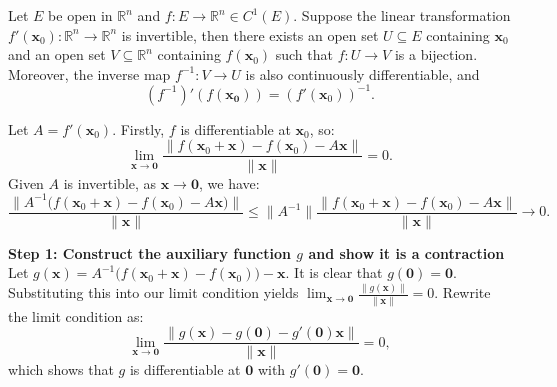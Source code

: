 \begin{theorem}
Let $E$ be open in $\mathbb{R}^n$ and $f:E\to\mathbb{R}^n\in C^1(E).$ Suppose the linear transformation $f'(\mathbf{x}_0):\mathbb{R}^n\to\mathbb{R}^n$ is invertible, then there exists an open set $U\subseteq E$ containing $\mathbf{x}_0$ and an open set $V\subseteq\mathbb{R}^n$ containing $f(\mathbf{x}_0)$ such that $f:U\to V$ is a bijection.
Moreover, the inverse map $f^{-1}:V\to U$ is also continuously differentiable, and 
$$(f^{-1})'(f(\mathbf{x_0}))=(f'(\mathbf{x}_0))^{-1}.$$
\end{theorem}


\begin{pfbox}

Let $A=f'(\mathbf{x}_0)$. Firstly, $f$ is differentiable at $\mathbf{x}_0$, so:
$$ \lim_{\mathbf{x}\to \mathbf{0}}\frac{\|f(\mathbf{x}_0+\mathbf{x})-f(\mathbf{x}_0)-A\mathbf{x}\|}{\|\mathbf{x}\|} = 0. $$
Given $A$ is invertible, as $\mathbf{x}\to\mathbf{0}$, we have:
$$ \frac{\|A^{-1}\big(f(\mathbf{x}_0+\mathbf{x})-f(\mathbf{x}_0)-A\mathbf{x}\big)\|}{\|\mathbf{x}\|} \le \|A^{-1}\|\frac{\|f(\mathbf{x}_0+\mathbf{x})-f(\mathbf{x}_0)-A\mathbf{x}\|}{\|\mathbf{x}\|} \to 0. $$

\vspace{0.8em}
\noindent \textbf{Step 1: Construct the auxiliary function $g$ and show it is a contraction}\\
Let $g(\mathbf{x})=A^{-1}\big(f(\mathbf{x}_0+\mathbf{x})-f(\mathbf{x}_0)\big)-\mathbf{x}$. It is clear that $g(\mathbf{0})=\mathbf{0}$.
Substituting this into our limit condition yields $\lim_{\mathbf{x}\to\mathbf{0}}\frac{\|g(\mathbf{x})\|}{\|\mathbf{x}\|}=0$. 
Rewrite the limit condition as:
$$ \lim_{\mathbf{x}\to\mathbf{0}}\frac{\|g(\mathbf{x})-g(\mathbf{0})-g'(\mathbf{0})\mathbf{x}\|}{\|\mathbf{x}\|} = 0, $$
which shows that $g$ is differentiable at $\mathbf{0}$ with $g'(\mathbf{0})=\mathbf{0}$.


\end{pfbox}
